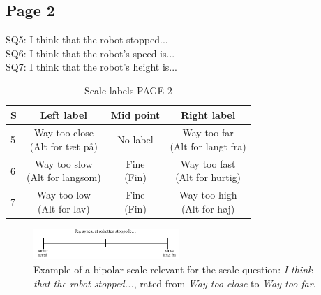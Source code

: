 \subsection{Page 2}
\noindent
SQ5: I think that the robot stopped... \\%
SQ6: I think that the robot's speed is... \\%
SQ7: I think that the robot's height is... \\%
%
\begin{table}[H]
	\centering
\caption{Scale labels PAGE 2}
	\label{tab:ScalesPage2} 
	\begin{tabular}{l|c|c|c}
		S     & Left label & Mid point & Right label \\\hline
		5   & \makecell{Way too close\\(Alt for tæt på)}  & No label & \makecell{Way too far \\(Alt for langt fra)}        \\\hline
		6   & \makecell{Way too slow\\(Alt for langsom)} & \makecell{Fine\\(Fin)} & \makecell{Way too fast \\(Alt for hurtig)}         \\\hline
		7   & \makecell{Way too low \\(Alt for lav)} & \makecell{Fine\\(Fin)} & \makecell{Way too high\\(Alt for høj)}                
	\end{tabular}        
\end{table}
\noindent
%
\begin{figure}[H]
\centering
\includegraphics[width = 0.49\textwidth]{Figure/TilpassetRStoppede}
\setlength{} 
\caption{Example of a bipolar scale relevant for the scale question: \textit{I think that the robot stopped...}, rated from \textit{Way too close} to \textit{Way too far}.}
\label{fig:TilpassetRStoppede}
\end{figure}
\noindent
% 

